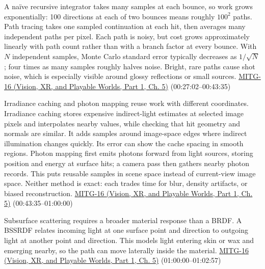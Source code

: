 A naïve recursive integrator takes many samples at each bounce, so work grows exponentially: 100 directions at each of two bounces means roughly \(100^2\) paths. Path tracing takes one sampled continuation at each hit, then averages many independent paths per pixel. Each path is noisy, but cost grows approximately linearly with path count rather than with a branch factor at every bounce. With \(N\) independent samples, Monte Carlo standard error typically decreases as \(1/\sqrt{N}\); four times as many samples roughly halves noise. Bright, rare paths cause shot noise, which is especially visible around glossy reflections or small sources. \href{../07-Vision-XR-and-Playable-Worlds-P01/main.pdf\#nameddest=04-visual-computing-ii-ch036-mitg-16---global-illumination}{MITG-16 (Vision, XR, and Playable Worlds, Part 1, Ch. 5)} (00:27:02--00:43:35)

Irradiance caching and photon mapping reuse work with different coordinates. Irradiance caching stores expensive indirect-light estimates at selected image pixels and interpolates nearby values, while checking that hit geometry and normals are similar. It adds samples around image-space edges where indirect illumination changes quickly. Its error can show the cache spacing in smooth regions. Photon mapping first emits photons forward from light sources, storing position and energy at surface hits; a camera pass then gathers nearby photon records. This puts reusable samples in scene space instead of current-view image space. Neither method is exact: each trades time for blur, density artifacts, or biased reconstruction. \href{../07-Vision-XR-and-Playable-Worlds-P01/main.pdf\#nameddest=04-visual-computing-ii-ch036-mitg-16---global-illumination}{MITG-16 (Vision, XR, and Playable Worlds, Part 1, Ch. 5)} (00:43:35--01:00:00)

Subsurface scattering requires a broader material response than a BRDF. A BSSRDF relates incoming light at one surface point and direction to outgoing light at another point and direction. This models light entering skin or wax and emerging nearby, so the path can move laterally inside the material. \href{../07-Vision-XR-and-Playable-Worlds-P01/main.pdf\#nameddest=04-visual-computing-ii-ch036-mitg-16---global-illumination}{MITG-16 (Vision, XR, and Playable Worlds, Part 1, Ch. 5)} (01:00:00--01:02:57)

